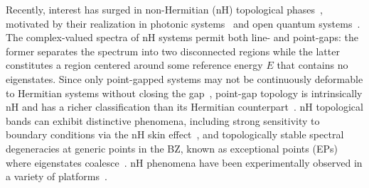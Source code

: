 \documentclass[aps,prl,twocolumn,amsmath,amssymb,floatfix,superscriptaddress]{revtex4-2}
\begin{document}
Recently, interest has surged in non-Hermitian (nH) topological phases~\cite{KunstRMP,UedaReview}, motivated by their realization in photonic systems~\cite{makris2008,bennet2011,peschel2012,jing2014,feng2014,hodaei2014,peng2014,wu2019,PTreview} and open quantum systems~\cite{naghiloo2019,Minganti2019,jaramillo2020}. The complex-valued spectra of nH systems permit both line- and point-gaps: the former separates the spectrum into two disconnected regions while the latter constitutes a region centered around some reference energy $E$ that contains no eigenstates. Since only point-gapped systems may not be continuously deformable to Hermitian systems without closing the gap~\cite{UedaPaper18,KawabataClassification19}, point-gap topology is intrinsically nH and has a richer classification than its Hermitian counterpart~\cite{KawabataClassification19,HarryPeriodicTable19}. nH topological bands can exhibit distinctive phenomena, including strong sensitivity to boundary conditions via the nH skin effect~\cite{Lee:2016,Torres:2018,YaoZhong18,LonghiSkin19,Jin19,YaoZhongSkin19,Lee:2019,HerviouSVD19,TopoSkin20,zhang2020correspondence,Sato-PRL:2020,Yoshida20,Borgnia20,Kawabata20HOskin,Vecsei21,zhang2021universal}, and topologically stable spectral degeneracies at generic points in the BZ, known as exceptional points (EPs) where eigenstates coalesce~\cite{BerryEP,HeissEP,NoriNH17,XuRings2017,FuNH18,bergholtz2018,moors2019,yang2019semi,kawabata2019semi,Lin19,xue2020,denner2020exceptional,yang2021fermion}. nH phenomena have been experimentally observed in a variety of platforms~\cite{Zhou2018arcs,cerjan2019,corentin2019,Ghatak29561,HofmannReciprocal20,Xiao2020,Helbig20Skin,weidemann2020topological,LiCriticalSkin20,palacios2020,stegmaier2020topological}.
\end{document}
